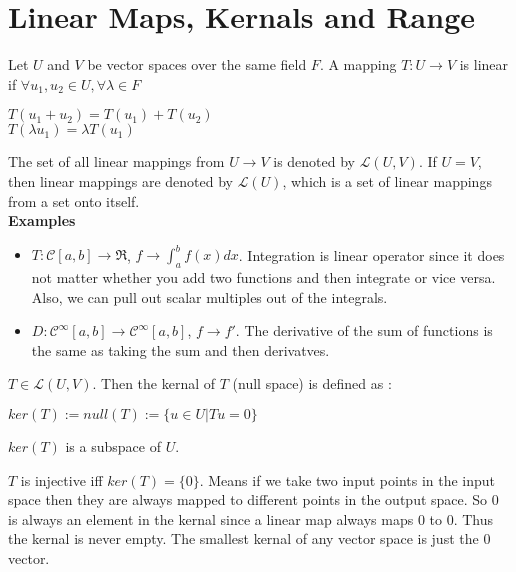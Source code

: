 \chapter{Linear Maps, Kernals and Range}

\begin{definition}
	Let $U$ and $V$ be vector spaces over the same field $F$. A mapping $T:U \rightarrow V$ is linear if 	$ \forall u_1, u_2 \in U, \forall \lambda \in F$ 
	\begin{center}
 		$T(u_1 + u_2) = T(u_1) + T(u_2)$\\ 
 		$T(\lambda u_1) = \lambda T(u_1)$
	\end{center}
	
\end{definition}

The set of all linear mappings from $U \rightarrow V$ is denoted by $\mathcal{L}(U,V)$. If $U=V$, then linear mappings are denoted by $\mathcal{L}(U)$, which is a set of linear mappings from a set onto itself. \\ 

\textbf{Examples}
\begin{itemize}
	\item $T: \mathcal{C}[a, b] \rightarrow \Re$, $f \rightarrow \int_{a}^{b} f(x) dx$. Integration is linear operator since it does not matter whether you add two functions and then integrate or vice versa. Also, we can pull out scalar multiples out of the integrals. 
	\item $D: \mathcal{C}^{\infty} [a, b] \rightarrow \mathcal{C}^{\infty} [a, b]$, $f \rightarrow f'$. The derivative of the sum of functions is the same as taking the sum and then derivatves. \\
\end{itemize}

\begin{definition}
	$T \in \mathcal{L}(U, V)$. Then the kernal of $T$ (null space) is defined as : 
	\begin{center}
		$ker(T) := null(T) := \{u \in U | Tu = 0\}$
	\end{center}
	
\end{definition}

\begin{proposition}
	$ker(T)$ is a subspace of $U$.
\end{proposition}

$T$ is injective iff $ker(T) = \{0\}$. Means if we take two input points in the input space then they are always mapped to different points in the output space. 
So 0 is always an element in the kernal since a linear map always maps 0 to 0. Thus the kernal is never empty. The smallest kernal of any vector space is just the 0 vector. 

